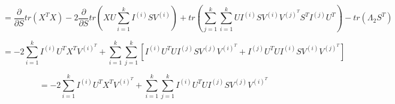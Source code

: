 \documentclass[paper=a4, fontsize=11pt]{scrartcl} %
\numberwithin{equation}{section} %
\numberwithin{figure}{section} %
\numberwithin{table}{section} %
\begin{document}
$$= \frac{\partial}{\partial S} tr(X^TX) - 2 \frac{\partial}{\partial S} tr(X U \sum_{i=1}^{k} I^{(i)} S V^{(i)}) + tr(\sum_{j=1}^k \sum_{i=1}^k U I^{(i)} S V^{(i)} V^{(j)^T} S^T I^{(j)} U^T ) - tr(\Lambda_2 S^T)$$

$$= -2 \sum_{i=1}^{k} I^{(i)} U^T X^T V^{(i)^T} + \sum_{i=1}^{k} \sum_{j=1}^{k} [ I^{(i)} U^T U I^{(j)} S V^{(j)} V^{(i)^T} +  I^{(j)} U^T U I^{(i)} S V^{(i)} V^{(j)^T} ]$$

$$= -2 \sum_{i=1}^{k} I^{(i)} U^T X^T V^{(i)^T} + \sum_{i=1}^{k} \sum_{j=1}^{k} I^{(i)} U^T U I^{(j)} S V^{(j)} V^{(i)^T}$$
\end{document}
